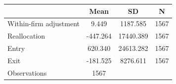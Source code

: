{
\def\sym#1{\ifmmode^{#1}\else\(^{#1}\)\fi}
\begin{tabular}{l*{1}{ccc}}
\toprule
                    &        Mean&          SD&           N\\
\midrule
Within-firm adjustment&       9.449&    1187.585&        1567\\
Reallocation        &    -447.264&   17440.389&        1567\\
Entry               &     620.340&   24613.282&        1567\\
Exit                &    -181.525&    8276.611&        1567\\
\midrule
Observations        &        1567&            &            \\
\bottomrule
\end{tabular}
}
